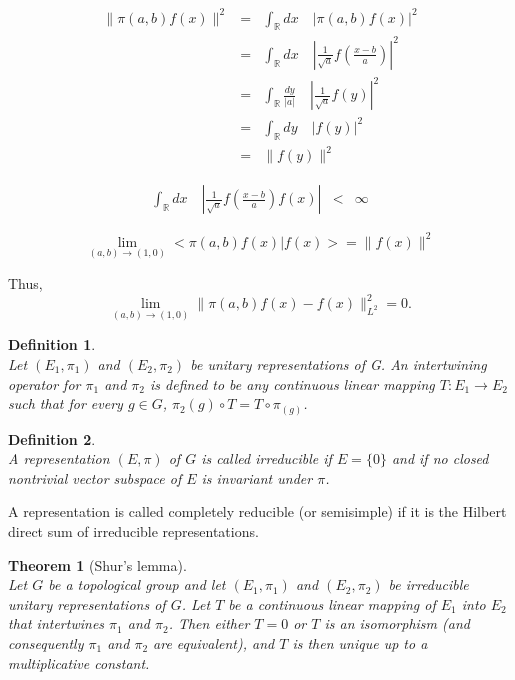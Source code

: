 \documentclass[a4paper,11pt]{article} %
\newcommand{\norm}[1]{\|{#1}\|} %
\numberwithin{equation}{section} %
\numberwithin{figure}{section} %
\newtheorem{dfn}{Definition}
\newtheorem{thm}{Theorem}
\begin{document}
\begin{eqnarray*}
\norm{\pi(a,b) f(x)}^2 &=& \int_{\mathbb{R}} dx \quad \left| \pi(a,b) f(x) \right|^2 \\
&=& \int_{\mathbb{R}} dx \quad \left| \frac{1}{\sqrt{a}} f\left( \frac{x-b}{a} \right) \right|^2 \\
&=& \int_{\mathbb{R}} \frac{dy}{|a|} \quad \left| \frac{1}{\sqrt{a}} f(y) \right|^2 \\
&=& \int_{\mathbb{R}} dy \quad \left| f(y) \right|^2 \\
&=& \norm{f(y)}^2
\end{eqnarray*}

\begin{eqnarray*}
\int_{\mathbb{R}} dx \quad \left| \frac{1}{\sqrt{a}} f\left(\frac{x-b}{a}\right) f(x) \right| &<& \infty  
\end{eqnarray*}

\begin{equation*}
\lim_{(a,b) \to (1,0)} < \pi(a,b) f(x) | f(x) > = \norm{f(x)}^2
\end{equation*}

Thus,
\begin{equation}
\lim_{(a,b) \to (1,0)}  \norm{\pi(a,b) f(x) - f(x)}_{L^2}^2 = 0.
\end{equation}

\begin{dfn} \cite[Def. 3.2, p. 37]{Yvette2005} \\
Let $(E_1 , \pi_1)$ and $(E_2 , \pi_2)$ be unitary representations of G. An intertwining operator for $\pi_1$ and $\pi_2$ is defined to be any continuous linear mapping $T : E_1 \to E_2$ such that for every $g \in G$, $\pi_2(g) \circ T = T \circ \pi_ (g)$. 
\end{dfn}

\begin{dfn} \cite[Def. 3.3, p.37]{Yvette2005} \\
A representation $(E, \pi)$ of $G$ is called irreducible if $E = \{0\}$ and if no closed nontrivial vector subspace of $E$ is invariant under $\pi$.
\end{dfn}

A representation is called completely reducible (or semisimple) if it is the Hilbert direct sum of irreducible representations.

\begin{thm}[Shur's lemma] \cite[Thm. 3.6, p. 38]{Yvette2005} \\
Let $G$ be a topological group and let $(E_1 , \pi_1)$ and $(E_2 , \pi_2)$ be irreducible unitary representations of $G$. Let $T$ be a continuous linear mapping of $E_1$ into $E_2$ that intertwines $\pi_1$ and $\pi_2$. Then either $T = 0$ or $T$ is an isomorphism (and consequently $\pi_1$ and $\pi_2$ are equivalent), and $T$ is then unique up to a multiplicative constant. 
\end{thm}
\end{document}
